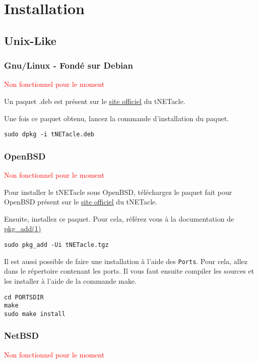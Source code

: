 ﻿\section{Installation}
\subsection{Unix-Like}
\subsubsection{Gnu/Linux - Fondé sur Debian}
\textcolor{red}{Non fonctionnel pour le moment}

Un paquet .deb est présent sur le \href{http://eip.epitech.eu/2013/tnetacle/tnetacle.html}{site officiel} du tNETacle.

Une fois ce paquet obtenu, lancez la commande d'installation du paquet.

\begin{lstlisting}
sudo dpkg -i tNETacle.deb
\end{lstlisting}

\subsubsection{OpenBSD}
\textcolor{red}{Non fonctionnel pour le moment}

Pour installer le tNETacle sous OpenBSD, téléchargez le
paquet fait pour OpenBSD présent sur le \href{http://eip.epitech.eu/2013/tnetacle/tnetacle.html}{site officiel} du tNETacle.

Ensuite, installez ce paquet. Pour cela, référez vous à la documentation de
\href{http://www.openbsd.org/faq/fr/faq15.html}{pkg\_add(1)}

\begin{lstlisting}
sudo pkg_add -Ui tNETacle.tgz
\end{lstlisting}


Il est aussi possible de faire une installation à l'aide des \texttt{Ports}.
Pour cela, allez dans le répertoire contenant les ports.
Il vous faut ensuite compiler les sources et les installer à l'aide de la commande make.

\begin{lstlisting}
cd PORTSDIR
make
sudo make install
\end{lstlisting}

\subsubsection{NetBSD}
\textcolor{red}{Non fonctionnel pour le moment}

